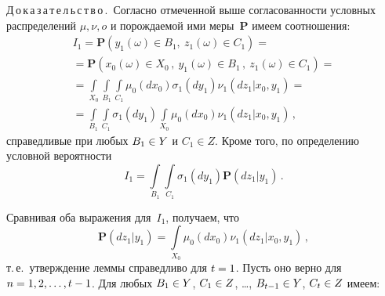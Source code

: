 \begin{multicols}{2}
  \noindent
  Д\,о\,к\,а\,з\,а\,т\,е\,л\,ь\,с\,т\,в\,о\,.\ Согласно отмеченной выше согласованности 
условных распределений $\mu,\nu,o$ и порождаемой ими меры~\textbf{P} имеем 
соотношения:
  \begin{multline*}
  I_1=\mathbf{P}\left(
  y_1(\omega)\in B_1,\ z_1(\omega)\in C_1\right) ={}\\[1pt]
  {}=
  \mathbf{P}\left( x_0(\omega)\in X_0\,,\ y_1(\omega)\in B_1\,,\ z_1(\omega)\in 
C_1\right)={}\\[1pt]
  {}=\int\limits_{X_0} \int\limits_{B_1} \int\limits_{C_1} \mu_0\left(dx_0\right) 
\sigma_1\left(dy_1\right) \nu_1\left(dz_1\vert x_0,y_1\right)={}\\[1pt]
  {}= \int\limits_{B_1}\int\limits_{C_1}\sigma_1\left(dy_1\right) \int\limits_{X_0}\mu_0\left( 
dx_0\right) \nu_1\left( dz_1\vert x_0,y_1\right)\,,
  \end{multline*}
справедливые при любых $B_1\hm\in Y$ и $C_1\in Z$. Кроме того, по определению 
условной вероятности
$$
I_1=\int\limits_{B_1}\int\limits_{C_1}\sigma_1\left(dy_1\right) \mathbf{P}\left(dz_1\vert 
y_1\right)\,.
$$
  
  Сравнивая оба выражения для~$I_1$, получаем, что
  $$
  \mathbf{P}\left( dz_1\vert 
y_1\right)=\int\limits_{X_0}\mu_0\left(dx_0\right)\nu_1\left(dz_1\vert x_0, y_1\right)\,,
  $$
т.\,е.\ утверждение леммы справедливо для $t\hm=1$. Пусть оно верно для $n\hm=1, 2, 
\ldots , t\hm-1$. Для любых $B_1\hm\in Y$, $C_1\hm\in Z$, \ldots , $B_{t-1}\hm\in Y$, 
$C_t\hm\in Z$ имеем:


\end{multicols}
